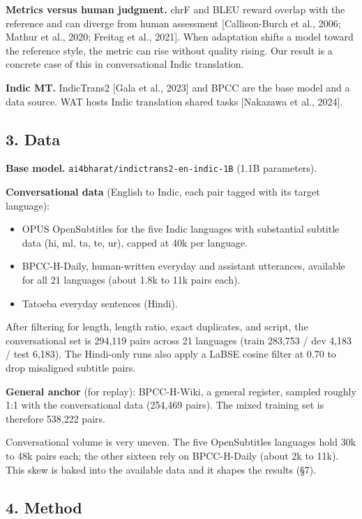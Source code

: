 \documentclass[
  11pt,
]{article}
\providecommand{\tightlist}{%
  \setlength{\itemsep}{0pt}\setlength{\parskip}{0pt}}
\begin{document}
\textbf{Metrics versus human judgment.} chrF and BLEU reward overlap
with the reference and can diverge from human assessment
{[}Callison-Burch et al., 2006; Mathur et al., 2020; Freitag et al.,
2021{]}. When adaptation shifts a model toward the reference style, the
metric can rise without quality rising. Our result is a concrete case of
this in conversational Indic translation.

\textbf{Indic MT.} IndicTrans2 {[}Gala et al., 2023{]} and BPCC are the
base model and a data source. WAT hosts Indic translation shared tasks
{[}Nakazawa et al., 2024{]}.

\hypertarget{data}{%
\subsection{3. Data}\label{data}}

\textbf{Base model.} \texttt{ai4bharat/indictrans2-en-indic-1B} (1.1B
parameters).

\textbf{Conversational data} (English to Indic, each pair tagged with
its target language):

\begin{itemize}
\tightlist
\item
  OPUS OpenSubtitles for the five Indic languages with substantial
  subtitle data (hi, ml, ta, te, ur), capped at 40k per language.
\item
  BPCC-H-Daily, human-written everyday and assistant utterances,
  available for all 21 languages (about 1.8k to 11k pairs each).
\item
  Tatoeba everyday sentences (Hindi).
\end{itemize}

After filtering for length, length ratio, exact duplicates, and script,
the conversational set is 294,119 pairs across 21 languages (train
283,753 / dev 4,183 / test 6,183). The Hindi-only runs also apply a
LaBSE cosine filter at 0.70 to drop misaligned subtitle pairs.

\textbf{General anchor} (for replay): BPCC-H-Wiki, a general register,
sampled roughly 1:1 with the conversational data (254,469 pairs). The
mixed training set is therefore 538,222 pairs.

Conversational volume is very uneven. The five OpenSubtitles languages
hold 30k to 48k pairs each; the other sixteen rely on BPCC-H-Daily
(about 2k to 11k). This skew is baked into the available data and it
shapes the results (§7).

\hypertarget{method}{%
\subsection{4. Method}\label{method}}
\end{document}
